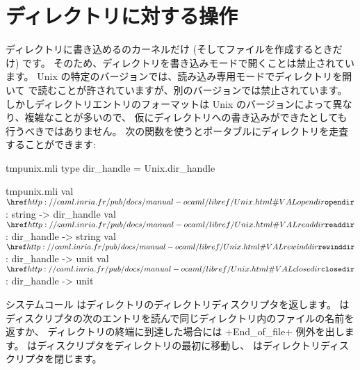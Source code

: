 \section{ディレクトリに対する操作}

ディレクトリに書き込めるのカーネルだけ (そしてファイルを作成するときだけ) です。
そのため、ディレクトリを書き込みモードで開くことは禁止されています。
Unix の特定のバージョンでは、読み込み専用モードでディレクトリを開いて 
で読むことが許されていますが、別のバージョンでは禁止されています。
しかしディレクトリエントリのフォーマットは Unix のバージョンによって異なり、複雑なことが多いので、
仮にディレクトリへの書き込みができたとしても行うべきではありません。
次の関数を使うとポータブルにディレクトリを走査することができます:
%
\begin{codefile}{tmpunix.mli}
type dir_handle = Unix.dir_handle
\end{codefile}
%
\begin{listingcodefile}{tmpunix.mli}
val $\libvalue{Unix}{opendir}$   : string -> dir_handle
val $\libvalue{Unix}{readdir}$   : dir_handle -> string
val $\libvalue{Unix}{rewinddir}$ : dir_handle -> unit
val $\libvalue{Unix}{closedir}$  : dir_handle -> unit
\end{listingcodefile}
%
システムコール  はディレクトリのディレクトリディスクリプタを返します。
 はディスクリプタの次のエントリを読んで同じディレクトリ内のファイルの名前を返すか、
ディレクトリの終端に到達した場合には \ml+End_of_file+ 例外を出します。
 はディスクリプタをディレクトリの最初に移動し、
 はディレクトリディスクリプタを閉じます。
